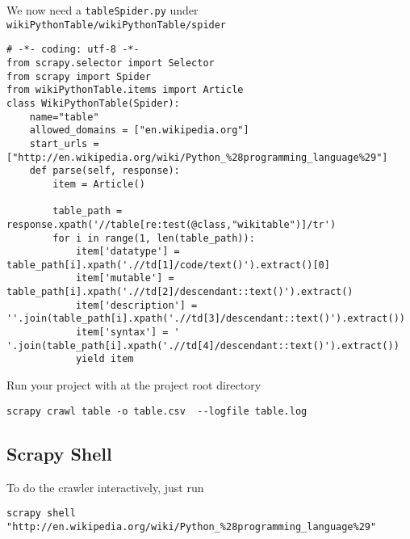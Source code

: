 \documentclass{article}
\begin{document}
    We now need a \texttt{tableSpider.py} under
\texttt{wikiPythonTable/wikiPythonTable/spider}

\begin{verbatim}
# -*- coding: utf-8 -*-
from scrapy.selector import Selector
from scrapy import Spider
from wikiPythonTable.items import Article
class WikiPythonTable(Spider):
    name="table"
    allowed_domains = ["en.wikipedia.org"]
    start_urls = ["http://en.wikipedia.org/wiki/Python_%28programming_language%29"]
    def parse(self, response):
        item = Article()

        table_path = response.xpath('//table[re:test(@class,"wikitable")]/tr')
        for i in range(1, len(table_path)):
            item['datatype'] = table_path[i].xpath('.//td[1]/code/text()').extract()[0]
            item['mutable'] = table_path[i].xpath('.//td[2]/descendant::text()').extract()
            item['description'] = ''.join(table_path[i].xpath('.//td[3]/descendant::text()').extract())
            item['syntax'] = ' '.join(table_path[i].xpath('.//td[4]/descendant::text()').extract())    
            yield item
\end{verbatim}

    Run your project with at the project root directory

\begin{verbatim}
scrapy crawl table -o table.csv  --logfile table.log
\end{verbatim}

    \subsection{Scrapy Shell}\label{scrapy-shell}

To do the crawler interactively, just run

\begin{verbatim}
scrapy shell "http://en.wikipedia.org/wiki/Python_%28programming_language%29"
\end{verbatim}


    
    
    
    
\end{document}
